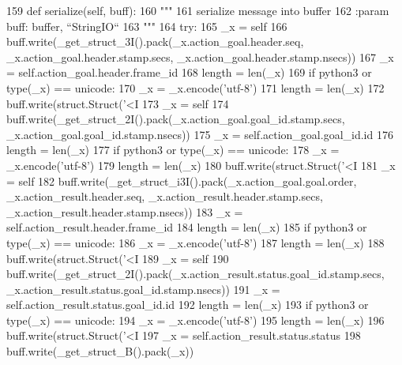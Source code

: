 \begin{DoxyCode}
159   \textcolor{keyword}{def }serialize(self, buff):
160     \textcolor{stringliteral}{"""}
161 \textcolor{stringliteral}{    serialize message into buffer}
162 \textcolor{stringliteral}{    :param buff: buffer, ``StringIO``}
163 \textcolor{stringliteral}{    """}
164     \textcolor{keywordflow}{try}:
165       \_x = self
166       buff.write(\_get\_struct\_3I().pack(\_x.action\_goal.header.seq, \_x.action\_goal.header.stamp.secs, 
      \_x.action\_goal.header.stamp.nsecs))
167       \_x = self.action\_goal.header.frame\_id
168       length = len(\_x)
169       \textcolor{keywordflow}{if} python3 \textcolor{keywordflow}{or} type(\_x) == unicode:
170         \_x = \_x.encode(\textcolor{stringliteral}{'utf-8'})
171         length = len(\_x)
172       buff.write(struct.Struct(\textcolor{stringliteral}{'<I%
173       \_x = self
174       buff.write(\_get\_struct\_2I().pack(\_x.action\_goal.goal\_id.stamp.secs, 
      \_x.action\_goal.goal\_id.stamp.nsecs))
175       \_x = self.action\_goal.goal\_id.id
176       length = len(\_x)
177       \textcolor{keywordflow}{if} python3 \textcolor{keywordflow}{or} type(\_x) == unicode:
178         \_x = \_x.encode(\textcolor{stringliteral}{'utf-8'})
179         length = len(\_x)
180       buff.write(struct.Struct(\textcolor{stringliteral}{'<I%
181       \_x = self
182       buff.write(\_get\_struct\_i3I().pack(\_x.action\_goal.goal.order, \_x.action\_result.header.seq, 
      \_x.action\_result.header.stamp.secs, \_x.action\_result.header.stamp.nsecs))
183       \_x = self.action\_result.header.frame\_id
184       length = len(\_x)
185       \textcolor{keywordflow}{if} python3 \textcolor{keywordflow}{or} type(\_x) == unicode:
186         \_x = \_x.encode(\textcolor{stringliteral}{'utf-8'})
187         length = len(\_x)
188       buff.write(struct.Struct(\textcolor{stringliteral}{'<I%
189       \_x = self
190       buff.write(\_get\_struct\_2I().pack(\_x.action\_result.status.goal\_id.stamp.secs, 
      \_x.action\_result.status.goal\_id.stamp.nsecs))
191       \_x = self.action\_result.status.goal\_id.id
192       length = len(\_x)
193       \textcolor{keywordflow}{if} python3 \textcolor{keywordflow}{or} type(\_x) == unicode:
194         \_x = \_x.encode(\textcolor{stringliteral}{'utf-8'})
195         length = len(\_x)
196       buff.write(struct.Struct(\textcolor{stringliteral}{'<I%
197       \_x = self.action\_result.status.status
198       buff.write(\_get\_struct\_B().pack(\_x))
}}}}
\end{DoxyCode}
